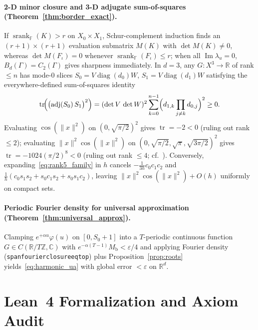 \documentclass[11pt,a4paper]{article}
\theoremstyle{plain}
\theoremstyle{definition}
\newcommand{\R}{\mathbb{R}}
\newcommand{\C}{\mathbb{C}}
\newcommand{\Field}{\mathbb{F}}
\DeclareMathOperator{\ImPart}{Im}
\DeclareMathOperator{\srank}{srank}
\DeclareRobustCommand{\leanid}[1]{{\def\_{\textunderscore\allowbreak}\texttt{#1}}}
\begin{document}
\paragraph{2-D minor closure and 3-D adjugate sum-of-squares (Theorem~\ref{thm:border_exact}).}
If $\srank_{\Field}(K) > r$ on $X_0 \times X_1$, Schur-complement induction finds an $(r+1)\times(r+1)$ evaluation submatrix $M(K)$ with $\det M(K) \ne 0$, whereas $\det M(F_\iota) = 0$ whenever $\srank_{\Field}(F_\iota) \le r$; when all $\ImPart\lambda_u = 0$, $B_d(\Gamma) = C_2(\Gamma)$ gives sharpness immediately. In $d = 3$, any $G : X^3 \to \R$ of rank $\le n$ has mode-$0$ slices $S_0 = V\operatorname{diag}(d_0)W$, $S_1 = V\operatorname{diag}(d_1)W$ satisfying the everywhere-defined sum-of-squares identity
\[
  \operatorname{tr}\!\Bigl(\bigl(\operatorname{adj}(S_0)\,S_1\bigr)^2\Bigr)
  = (\det V\,\det W)^2 \sum_{k=0}^{n-1} \Bigl(d_{1,k}\prod_{j \ne k} d_{0,j}\Bigr)^2 \ge 0.
\]
Evaluating $\cos(\|x\|^2)$ on $(0, \sqrt{\pi/2})^2$ gives $\operatorname{tr} = -2 < 0$ (ruling out rank $\le 2$); evaluating $\|x\|^2\cos(\|x\|^2)$ on $(0, \sqrt{\pi/2}, \sqrt{\pi}, \sqrt{3\pi/2})^2$ gives $\operatorname{tr} = -1024(\pi/2)^8 < 0$ (ruling out rank $\le 4$; cf.~\cite{desilva2008tensor,landsberg2012tensors}). Conversely, expanding~\eqref{eq:rank5_family} in $h$ cancels $-\frac{1}{3h}c_0 c_1 c_2$ and $\frac{1}{h}(c_0 s_1 s_2 + s_0 c_1 s_2 + s_0 s_1 c_2)$, leaving $\|x\|^2\cos(\|x\|^2) + O(h)$ uniformly on compact sets.

\paragraph{Periodic Fourier density for universal approximation (Theorem~\ref{thm:universal_approx}).}
Clamping $e^{+\alpha u}\varphi(u)$ on $[0, S_0 + 1]$ into a $T$-periodic continuous function $G \in C(\R/T\mathbb{Z}, \C)$ with $e^{-\alpha(T - 1)}M_{\mathrm{b}} < \varepsilon/4$ and applying Fourier density (\leanid{span\_fourier\_closure\_eq\_top}) plus Proposition~\ref{prop:roots} yields~\eqref{eq:harmonic_ua} with global error $< \varepsilon$ on $\R^d$.

\section{Lean~4 Formalization and Axiom Audit}\label{sec:formalization}
\end{document}
